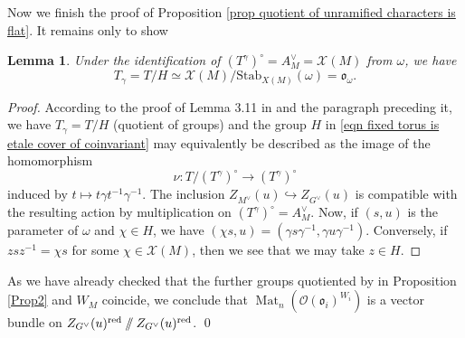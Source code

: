 \documentclass[10pt]{article}
\def\into{\mathrel{\hookrightarrow}}
\newcommand{\stab}[2]{\mathrm{Stab}_{#1}(#2)}
\DeclareMathOperator{\Mat}{Mat}
\newcommand{\git}{\mathbin{
  \mathchoice{/\mkern-6mu/}%
    {/\mkern-6mu/}%
    {/\mkern-5mu/}%
    {/\mkern-5mu/}}}%
\newcommand{\X}{\mathcal{X}}
\newcommand{\Ee}{\mathcal{E}}
\newcommand{\Oo}{\mathcal{O}}
\newtheorem{lem}{Lemma}
\theoremstyle{definition}
\theoremstyle{remark}
\newcommand{\Zur}{Z_{G^\vee}(u)^{\mathrm{red}}}
\begin{document}
Now we finish the proof of Proposition \ref{prop quotient of unramified characters is flat}.
It remains only to show
%
\begin{lem}
\label{lem quotients of unram characters and fixed torus agree}
Under the identification of $(T^\gamma)^\circ=A_M^\vee=\X(M)$ from $\omega$, we have 
%
\[
T_\gamma=T/H\simeq \X(M)/\stab{X(M)}{\omega}=\mathfrak{o}_\omega.
\]
%
\end{lem}
%
\begin{proof}
According to the proof of Lemma 3.11 in \cite{diss} and the paragraph preceding it, we have $T_\gamma=T/H$ (quotient of groups) and the group $H$ in \eqref{eqn fixed torus is etale cover of coinvariant} may equivalently be described as the image of the homomorphism
%
\[
\nu\colon T/(T^\gamma)^\circ\to (T^\gamma)^\circ
\]
%
induced by $t\mapsto t\gamma t^{-1}\gamma^{-1}$. The inclusion $Z_{M^\vee}(u)\into Z_{G^\vee}(u)$  is compatible with the resulting action by multiplication on $(T^\gamma)^\circ=A^\vee_M$. Now, if $(s, u)$ is the parameter of $\omega$ and $\chi\in H$, we have $(\chi s, u)=(\gamma s\gamma^{-1}, \gamma u\gamma^{-1})$. Conversely, if 
$z sz^{-1}=\chi s$ for some $\chi\in \X(M)$, then we see that we may take $z\in H$. 
%
%
%
%
\end{proof}
%
As we have already checked that the further groups quotiented by in Proposition \ref{Prop2} and $W_M$ coincide, we conclude that $\Mat_n (\Oo(\mathfrak{o}_i)^{W_i})$ is a vector bundle on $\Zur\git\Zur$.
\qed
\end{document}
